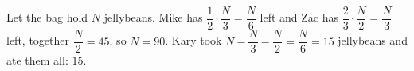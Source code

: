 Let the bag hold $N$ jellybeans. Mike has $\dfrac{1}{2}\cdot\dfrac {N}{3}=\dfrac {N}{6}$ left and Zac has $\dfrac{2}{3}\cdot\dfrac {N}{2}=\dfrac {N}{3}$ left, together $\dfrac {N}{2}=45$, so $N=90$. Kary took $N-\dfrac {N}{3}-\dfrac {N}{2}=\dfrac {N}{6}=15$ jellybeans and ate them all: $\boxed{15}$.
